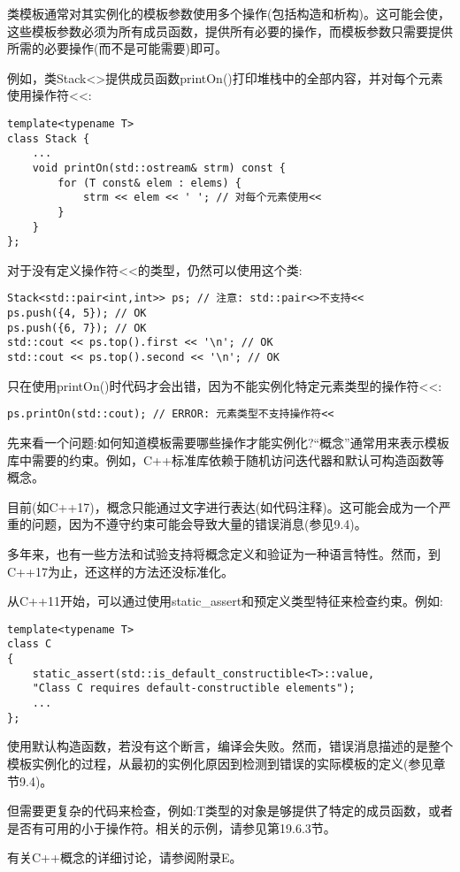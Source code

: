 
类模板通常对其实例化的模板参数使用多个操作(包括构造和析构)。这可能会使，这些模板参数必须为所有成员函数，提供所有必要的操作，而模板参数只需要提供所需的必要操作(而不是可能需要)即可。

例如，类Stack<>提供成员函数printOn()打印堆栈中的全部内容，并对每个元素使用操作符<{}<:

\begin{lstlisting}[style=styleCXX]
template<typename T>
class Stack {
	...
	void printOn(std::ostream& strm) const {
		for (T const& elem : elems) {
			strm << elem << ' '; // 对每个元素使用<<
		}
	}
};
\end{lstlisting}

对于没有定义操作符<{}<的类型，仍然可以使用这个类:

\begin{lstlisting}[style=styleCXX]
Stack<std::pair<int,int>> ps; // 注意: std::pair<>不支持<<
ps.push({4, 5}); // OK
ps.push({6, 7}); // OK
std::cout << ps.top().first << '\n'; // OK
std::cout << ps.top().second << '\n'; // OK
\end{lstlisting}

只在使用printOn()时代码才会出错，因为不能实例化特定元素类型的操作符<{}<:

\begin{lstlisting}[style=styleCXX]
ps.printOn(std::cout); // ERROR: 元素类型不支持操作符<<
\end{lstlisting}


先来看一个问题:如何知道模板需要哪些操作才能实例化?“概念”通常用来表示模板库中需要的约束。例如，C++标准库依赖于随机访问迭代器和默认可构造函数等概念。

目前(如C++17)，概念只能通过文字进行表达(如代码注释)。这可能会成为一个严重的问题，因为不遵守约束可能会导致大量的错误消息(参见9.4)。

多年来，也有一些方法和试验支持将概念定义和验证为一种语言特性。然而，到C++17为止，还这样的方法还没标准化。

从C++11开始，可以通过使用static\_assert和预定义类型特征来检查约束。例如:

\begin{lstlisting}[style=styleCXX]
template<typename T>
class C
{
	static_assert(std::is_default_constructible<T>::value,
	"Class C requires default-constructible elements");
	...
};
\end{lstlisting}

使用默认构造函数，若没有这个断言，编译会失败。然而，错误消息描述的是整个模板实例化的过程，从最初的实例化原因到检测到错误的实际模板的定义(参见章节9.4)。

但需要更复杂的代码来检查，例如:T类型的对象是够提供了特定的成员函数，或者是否有可用的小于操作符。相关的示例，请参见第19.6.3节。

有关C++概念的详细讨论，请参阅附录E。
















